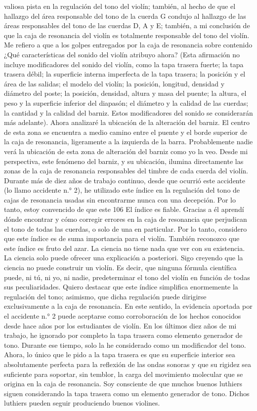valiosa pista en la regulación del tono del violín; también, al hecho de que el hallazgo del área responsable del tono de la cuerda G condujo al hallazgo de las áreas responsables del tono de las cuerdas D, A y E; también, a mi conclusión de que la caja de resonancia del violín es totalmente responsable del tono del violín. Me refiero a que a los golpes entregados por la caja de resonancia sobre contenido
¿Qué características del sonido del violín atribuyo ahora? (Esta afirmación no incluye modificadores del sonido del violín, como la tapa trasera fuerte; la tapa trasera débil; la superficie interna imperfecta de la tapa trasera; la posición y el área de las salidas; el modelo del violín; la posición, longitud, densidad y diámetro del poste; la posición, densidad, altura y masa del puente; la altura, el peso y la superficie inferior del diapasón; el diámetro y la calidad de las cuerdas; la cantidad y la calidad del barniz. Estos modificadores del sonido se considerarán más adelante).
Ahora analizaré la ubicación de la alteración del barniz. El centro de esta zona se encuentra a medio camino entre el puente y el borde superior de la caja de resonancia, ligeramente a la izquierda de la barra. Probablemente nadie verá la ubicación de esta zona de alteración del barniz como yo la veo. Desde mi perspectiva, este fenómeno del barniz, y su ubicación, ilumina directamente las zonas de la caja de resonancia responsables del timbre de cada cuerda del violín.
Durante más de diez años de trabajo continuo, desde que ocurrió este accidente (lo llamo accidente n.° 2), he utilizado este índice en la regulación del tono de cajas de resonancia usadas sin encontrarme nunca con una decepción. Por lo tanto, estoy convencido de que este
106
\label{plancha_tono}
El índice es fiable. Gracias a él aprendí dónde encontrar y cómo corregir errores en la caja de resonancia que perjudican el tono de todas las cuerdas, o solo de una en particular. Por lo tanto, considero que este índice es de suma importancia para el violín. También reconozco que este índice es fruto del azar. La ciencia no tiene nada que ver con su existencia. La ciencia solo puede ofrecer una explicación a posteriori. Sigo creyendo que la ciencia no puede construir un violín. Es decir, que ninguna fórmula científica puede, ni tú, ni yo, ni nadie, predeterminar el tono del violín en función de todas sus peculiaridades.
Quiero destacar que este índice simplifica enormemente la regulación del tono; asimismo, que dicha regulación puede dirigirse exclusivamente a la caja de resonancia. En este sentido, la evidencia aportada por el accidente n.° 2 puede aceptarse como corroboración de los hechos conocidos desde hace años por los estudiantes de violín. En los últimos diez años de mi trabajo, he ignorado por completo la tapa trasera como elemento generador de tono. Durante ese tiempo, solo la he considerado como un modificador del tono. Ahora, lo único que le pido a la tapa trasera es que su superficie interior sea absolutamente perfecta para la reflexión de las ondas sonoras y que su rigidez sea suficiente para soportar, sin temblor, la carga del movimiento molecular que se origina en la caja de resonancia. Soy consciente de que muchos buenos luthiers siguen considerando la tapa trasera como un elemento generador de tono. Dichos luthiers pueden seguir produciendo buenos violines.
